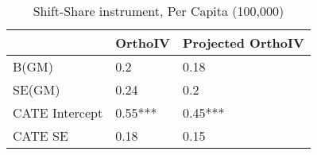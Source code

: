 \begin{table}\centering\caption{Shift-Share instrument, Per Capita (100,000)}\begin{tabular}{lll}
\toprule
                & OrthoIV   & Projected OrthoIV   \\
\midrule
 B(GM)          & 0.2       & 0.18                \\
 SE(GM)         & 0.24      & 0.2                 \\
 CATE Intercept & 0.55***   & 0.45***             \\
 CATE SE        & 0.18      & 0.15                \\
\bottomrule
\end{tabular}\end{table}